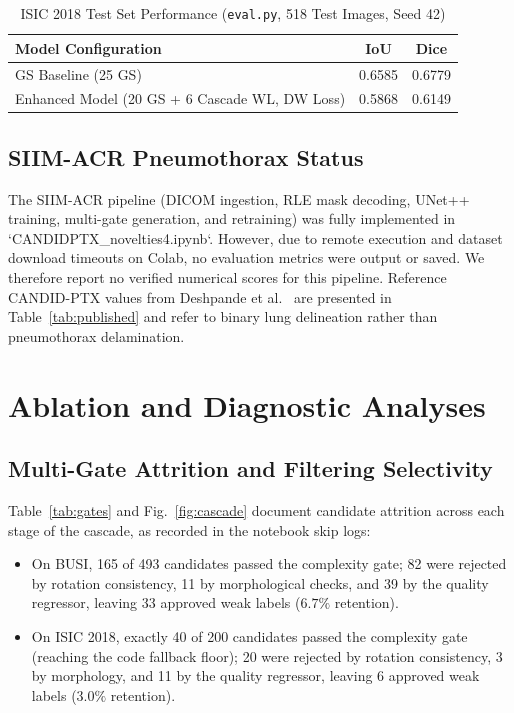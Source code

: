 \documentclass[journal,11pt,onecolumn,draftclsnofoot]{IEEEtran}
\begin{document}
\begin{table}[t]
\renewcommand{\arraystretch}{1.15}
\caption{ISIC 2018 Test Set Performance (\texttt{eval.py}, 518 Test Images, Seed 42)}
\label{tab:isic}
\centering\footnotesize
\begin{tabular}{@{}lcc@{}}
\toprule
Model Configuration & IoU & Dice \\
\midrule
GS Baseline (25 GS) & 0.6585 & 0.6779 \\
Enhanced Model (20 GS + 6 Cascade WL, DW Loss) & 0.5868 & 0.6149 \\
\bottomrule
\end{tabular}
\end{table}

\subsection{SIIM-ACR Pneumothorax Status}
\label{sec:siim}
The SIIM-ACR pipeline (DICOM ingestion, RLE mask decoding, UNet++ training, multi-gate generation, and retraining) was fully implemented in `CANDIDPTX_novelties4.ipynb`. However, due to remote execution and dataset download timeouts on Colab, no evaluation metrics were output or saved. We therefore report no verified numerical scores for this pipeline. Reference CANDID-PTX values from Deshpande et al.~\cite{deshpande2024} are presented in Table~\ref{tab:published} and refer to binary lung delineation rather than pneumothorax delamination.

\section{Ablation and Diagnostic Analyses}
\label{sec:ablation}

\subsection{Multi-Gate Attrition and Filtering Selectivity}
Table~\ref{tab:gates} and Fig.~\ref{fig:cascade} document candidate attrition across each stage of the cascade, as recorded in the notebook skip logs:
\begin{itemize}
    \item On BUSI, 165 of 493 candidates passed the complexity gate; 82 were rejected by rotation consistency, 11 by morphological checks, and 39 by the quality regressor, leaving 33 approved weak labels ($6.7\%$ retention).
    \item On ISIC 2018, exactly 40 of 200 candidates passed the complexity gate (reaching the code fallback floor); 20 were rejected by rotation consistency, 3 by morphology, and 11 by the quality regressor, leaving 6 approved weak labels ($3.0\%$ retention).
\end{itemize}
\end{document}
